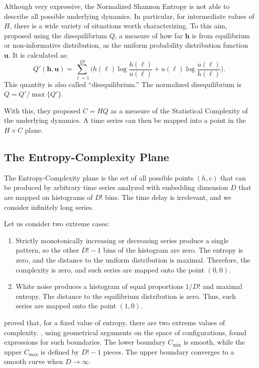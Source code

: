 \documentclass[alpha-refs]{wiley-article}
\begin{document}
Although very expressive, the Normalized Shannon Entropy is not able to describe all possible underlying dynamics.
In particular, for intermediate values of $H$, there is a wide variety of situations worth characterizing.
To this aim, \citet{LopezRuiz1995} proposed using the disequilibrium  $Q$, a measure of how far $\bm h$ is from equilibrium or non-informative distribution, as the uniform probability distribution function $\bm u$.
It is calculated as:
\begin{equation}
	Q'(\bm{h}, \bm{u}) = \sum_{\ell=1}^{D!} \Big(h(\ell) \log\frac{h(\ell)}{u(\ell)} +
	u(\ell) \log\frac{u(\ell)}{h(\ell)}
	\Big).
\end{equation}
This quantity is also called ``disequilibrium.''
The normalized disequilibrium is $ Q=Q'/\max\{Q'\}$.

With this, they proposed $C=HQ$ as a measure of the Statistical Complexity of the underlying dynamics.
A time series can then be mapped into a point in the $H\times C$ plane.

\subsection{The Entropy-Complexity Plane}\label{Sec:HCPlane}

The Entropy-Complexity plane is the set of all possible points $(h,c)$ that can be produced by arbitrary time series analyzed with embedding dimension $D$ that are mapped on histograms of $D!$ bins.
The time delay is irrelevant, and we consider infinitely long series.

Let us consider two extreme cases:
\begin{enumerate}[label=Case~\Roman*., align=left, leftmargin=*]
	\item 	Strictly monotonically increasing or decreasing series produce a single pattern, so the other $D!-1$ bins of the histogram are zero. 
	The entropy is zero, and the distance to the uniform distribution is maximal. 
	Therefore, the complexity is zero, and such series are mapped onto the point $(0,0)$.
	\item 	White noise produces a histogram of equal proportions $1/D!$ and maximal entropy. 
	The distance to the equilibrium distribution is zero. 
	Thus, such series are mapped onto the point $(1,0)$.
\end{enumerate}

\citet{SomeFeaturesoftheLMCStatisticalComplexity} proved that, for a fixed value of entropy, there are two extreme values of complexity.
\citet{martin2006generalized}, using geometrical arguments on the space of configurations, found expressions for such boundaries.
The lower boundary $C_{\min}$ is smooth, while the upper $C_{\max}$ is defined by $D!-1$ pieces.
The upper boundary converges to a smooth curve when $D\to\infty$.
\end{document}
